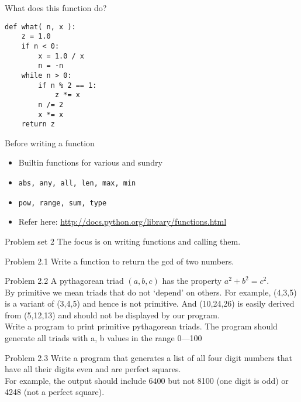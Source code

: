 \documentclass[14pt,compress]{beamer}
\newcounter{time}
\newcommand{\inctime}[1]{\addtocounter{time}{#1}{\tiny \thetime\ m}}
\newcommand{\typ}[1]{\texttt{#1}}
\begin{document}
\begin{frame}[fragile]
  {What does this function do?}
  \begin{lstlisting}
def what( n, x ):
    z = 1.0
    if n < 0:
        x = 1.0 / x
        n = -n
    while n > 0:
        if n % 2 == 1:
            z *= x
        n /= 2
        x *= x
    return z
  \end{lstlisting}
\end{frame}

\begin{frame}
  {Before writing a function}
  \begin{itemize}
      \item Builtin functions for various and sundry
      \item \typ{abs, any, all, len, max, min}
      \item \typ{pow, range, sum, type}
      \item Refer here:
          \url{http://docs.python.org/library/functions.html}
  \end{itemize}
  \inctime{15} 
\end{frame}

\begin{frame}{Problem set 2}
  The focus is on writing functions and calling them.
\end{frame}

\begin{frame}{Problem 2.1}
  Write a function to return the gcd of two numbers.
\end{frame}

\begin{frame}{Problem 2.2}
A pythagorean triad $(a,b,c)$ has the property $a^2 + b^2 = c^2$.\\By primitive we mean triads that do not `depend' on others. For example, (4,3,5) is a variant of (3,4,5) and hence is not primitive. And (10,24,26) is easily derived from (5,12,13) and should not be displayed by our program. \\
Write a program to print primitive pythagorean triads. The program should generate all triads with a, b values in the range 0---100
\end{frame}

\begin{frame}{Problem 2.3}
  Write a program that generates a list of all four digit numbers that have all their digits even and are perfect squares.\\For example, the output should include 6400 but not 8100 (one digit is odd) or 4248 (not a perfect square).
\end{frame}
\end{document}
